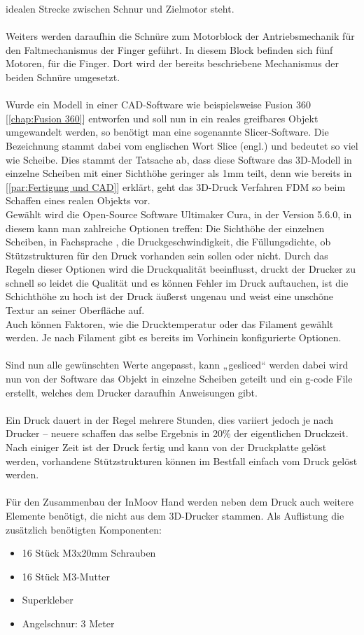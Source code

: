 \documentclass[titlepage,12pt,twoside]{article}
\begin{document}
idealen Strecke zwischen Schnur und Zielmotor steht. \\
\\
Weiters werden daraufhin die Schnüre zum Motorblock der Antriebsmechanik für den Faltmechanismus der Finger geführt. In diesem Block befinden sich fünf Motoren, für die Finger.
Dort wird der bereits beschriebene Mechanismus der beiden Schnüre umgesetzt. \\
\\
Wurde ein Modell in einer CAD-Software wie beispielsweise Fusion 360 [\textcolor{blue}{\autoref{chap:Fusion 360}}] entworfen und soll nun in ein reales greifbares Objekt umgewandelt werden, so benötigt man eine sogenannte Slicer-Software. Die Bezeichnung  stammt dabei vom englischen 
Wort Slice (engl.) und bedeutet so viel wie Scheibe. Dies stammt der Tatsache ab, dass diese Software das 3D-Modell in einzelne Scheiben mit einer Sichthöhe geringer als 1mm teilt, denn wie bereits in [\textcolor{blue}{\autoref{par:Fertigung und CAD}}] erklärt, geht das 3D-Druck Verfahren 
FDM so beim Schaffen eines realen Objekts vor. \\
Gewählt wird die Open-Source Software Ultimaker Cura, in der Version 5.6.0, in diesem kann man zahlreiche Optionen treffen: Die Sichthöhe der einzelnen Scheiben, in Fachsprache , die Druckgeschwindigkeit, die Füllungsdichte, ob Stützstrukturen für den 
Druck vorhanden sein sollen oder nicht. Durch das Regeln dieser Optionen wird die Druckqualität beeinflusst, druckt der Drucker zu schnell so leidet die Qualität und es können Fehler im Druck auftauchen, ist die Schichthöhe zu hoch ist der Druck 
äußerst ungenau und weist eine unschöne Textur an seiner Oberfläche auf. \\
Auch können Faktoren, wie die Drucktemperatur oder das Filament gewählt werden. Je nach Filament gibt es bereits im Vorhinein konfigurierte Optionen. \\
\\
Sind nun alle gewünschten Werte angepasst, kann „gesliced“ werden dabei wird nun von der Software das Objekt in einzelne Scheiben geteilt und ein g-code File erstellt, welches dem Drucker daraufhin Anweisungen gibt. \\
\\
Ein Druck dauert in der Regel mehrere Stunden, dies variiert jedoch je nach Drucker – neuere schaffen das selbe Ergebnis in 20\% der eigentlichen Druckzeit. \\
Nach einiger Zeit ist der Druck fertig und kann von der Druckplatte gelöst werden, vorhandene Stützstrukturen können im Bestfall einfach vom Druck gelöst werden. \\
\\
Für den Zusammenbau der InMoov Hand werden neben dem Druck auch weitere Elemente benötigt, die nicht aus dem 3D-Drucker stammen. 
Als Auflistung die zusätzlich benötigten Komponenten:
\begin{itemize}
	\item 16 Stück M3x20mm Schrauben
	\item 16 Stück M3-Mutter
	\item Superkleber
	\item Angelschnur: 3 Meter
\end{itemize}
\end{document}
